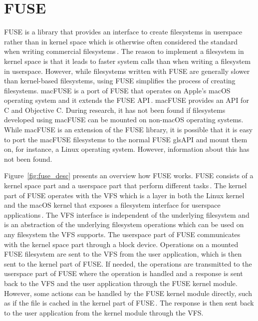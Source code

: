 \section{FUSE}
\gls{FUSE} is a library that provides an interface to create filesystems in userspace rather than in kernel space which is otherwise often considered the standard when writing commercial filesystems\,\cite{Libfuse2021}. The reason to implement a filesystem in kernel space is that it leads to faster system calls than when writing a filesystem in userspace. However, while filesystems written with \gls{FUSE} are generally slower than \mbox{kernel-based} filesystems, using \gls{FUSE} simplifies the process of creating filesystems. macFUSE is a port of \gls{FUSE} that operates on Apple's macOS operating system and it extends the \gls{FUSE} \gls{API}\,\cite{HomeMacFUSE}. macFUSE provides an \gls{API} for C and Objective C. During research, it has not been found if filesystems developed using macFUSE can be mounted on \mbox{non-macOS} operating systems. While macFUSE is an extension of the \gls{FUSE} library, it is possible that it is easy to port the macFUSE filesystems to the normal \gls{FUSE} gls{API} and mount them on, for instance, a Linux operating system. However, information about this has not been found.

Figure~\ref{fig:fuse_desc} presents an overview how \gls{FUSE} works. \gls{FUSE} consists of a kernel space part and a userspace part that perform different tasks\,\cite{vangoorFUSENotFUSE2017}. The kernel part of \gls{FUSE} operates with the \gls{VFS} which is a layer in both the Linux kernel and the macOS kernel that exposes a filesystem interface for userspace applications\,\cite{goochOverviewLinuxVirtual, singhMacOSInternals2006}. The \gls{VFS} interface is independent of the underlying filesystem and is an abstraction of the underlying filesystem operations which can be used on any filesystem the \gls{VFS} supports. The userspace part of \gls{FUSE} communicates with the kernel space part through a block device. Operations on a mounted \gls{FUSE} filesystem are sent to the \gls{VFS} from the user application, which is then sent to the kernel part of \gls{FUSE}. If needed, the operations are transmitted to the userspace part of \gls{FUSE} where the operation is handled and a response is sent back to the \gls{VFS} and the user application through the \gls{FUSE} kernel module. However, some actions can be handled by the \gls{FUSE} kernel module directly, such as if the file is cached in the kernel part of \gls{FUSE}\,\cite{vangoorFUSENotFUSE2017}. The response is then sent back to the user application from the kernel module through the \gls{VFS}.


